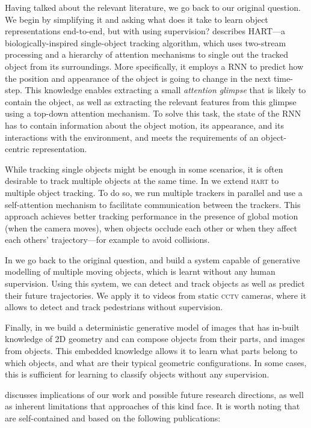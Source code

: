  	Having talked about the relevant literature, we go back to our original question. 
 	We begin by simplifying it and asking what does it take to learn object representations end-to-end, but with using supervision?
	 describes \textsc{HART}---a biologically-inspired single-object tracking algorithm, which uses two-stream processing and a hierarchy of attention mechanisms to single out the tracked object from its surroundings. 
	More specifically, it employs a \gls{RNN} to predict how the position and appearance of the object is going to change in the next time-step. 
	This knowledge enables extracting a small \textit{attention glimpse} that is likely to contain the object, as well as extracting the relevant features from this glimpse using a top-down attention mechanism.
	To solve this task, the state of the \gls{RNN} has to contain information about the object motion, its appearance, and its interactions with the environment, and meets the requirements of an object-centric representation.
	
 	While tracking single objects might be enough in some scenarios, it is often desirable to track multiple objects at the same time.
 	In  we extend \textsc{hart} to multiple object tracking.
 	To do so, we run multiple trackers in parallel and use a self-attention mechanism to facilitate communication between the trackers. This approach achieves better tracking performance in the presence of global motion (\!\eg when the camera moves), when objects occlude each other or when they affect each others' trajectory---for example to avoid collisions. 
 	
 	In  we go back to the original question, and build a system capable of generative modelling of multiple moving objects, which is learnt without any human supervision. 
 	Using this system, we can detect and track objects as well as predict their future trajectories. 
 	We apply it to videos from static \textsc{cctv} cameras, where it allows to detect and track pedestrians without supervision.
 
  	Finally, in  we build a deterministic generative model of images that has in-built knowledge of 2D geometry and can compose objects from their parts, and images from objects.
  	  This embedded knowledge allows it to learn what parts belong to which objects, and what are their typical geometric configurations.
  	    In some cases, this is sufficient for learning to classify objects without any supervision.
 	
 	 discusses implications of our work and possible future research directions, as well as inherent limitations that approaches of this kind face. 
 	 It is worth noting that  are self-contained and based on the following publications:
 	 
